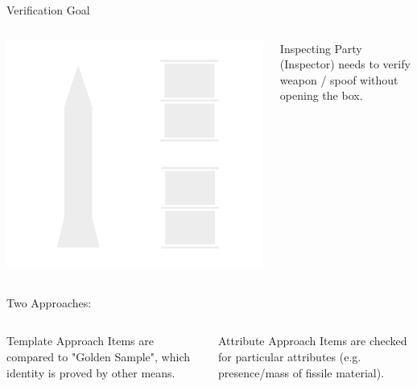 \documentclass[presentation]{beamer}
\begin{document}
\begin{frame}[label=sec-2-5]{Verification Goal}
\begin{columns}
\begin{column}{0.18\textwidth}
\includegraphics[width=\textwidth]{images/ib/box_transparent}
\end{column}
\begin{column}{0.28\textwidth}
\small
Inspecting Party (Inspector) needs to verify weapon / spoof without opening the box.
\end{column}
\end{columns}


\vfill
Two Approaches:
\begin{columns}

\begin{column}{0.48\textwidth}
\begin{block}{Template Approach}
\small
Items are compared to "Golden Sample", which identity is proved by other means.
\end{block}
\end{column}

\begin{column}{0.48\textwidth}
\begin{block}{Attribute Approach}
\small
Items are checked for particular attributes (e.g. presence/mass of fissile material).
\end{block}
\end{column}
\end{columns}
\end{frame}
\end{document}

